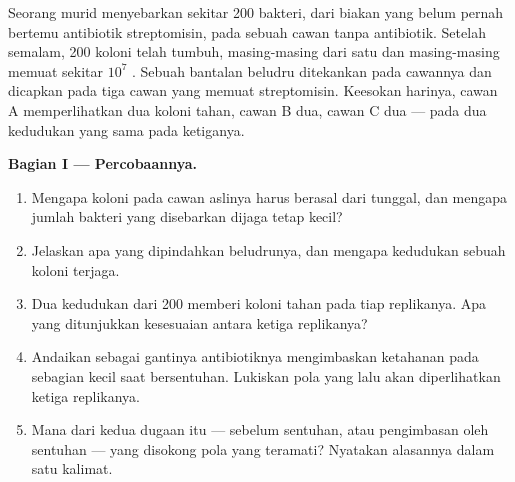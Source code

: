 \begin{problem}
\label{pb:g11:mutations:1}
Seorang murid menyebarkan sekitar 200 bakteri, dari biakan yang belum
pernah bertemu antibiotik streptomisin, pada sebuah cawan tanpa
antibiotik. Setelah semalam, 200 koloni telah tumbuh, masing-masing
dari satu  dan masing-masing memuat sekitar $10^7$ . Sebuah
bantalan beludru ditekankan pada cawannya dan dicapkan pada tiga cawan
yang memuat streptomisin. Keesokan harinya, cawan A memperlihatkan dua
koloni tahan, cawan B dua, cawan C dua --- pada dua kedudukan yang sama
pada ketiganya.

\medskip
\noindent\textbf{Bagian I --- Percobaannya.}
\begin{enumerate}
  \item Mengapa koloni pada cawan aslinya harus berasal dari 
        tunggal, dan mengapa jumlah bakteri yang disebarkan dijaga tetap kecil?
  \item Jelaskan apa yang dipindahkan beludrunya, dan mengapa kedudukan
        sebuah koloni terjaga.
  \item Dua kedudukan dari 200 memberi koloni tahan pada tiap
        replikanya. Apa yang ditunjukkan kesesuaian antara ketiga
        replikanya?
  \item Andaikan sebagai gantinya antibiotiknya mengimbaskan ketahanan
        pada sebagian kecil  saat bersentuhan. Lukiskan pola yang
        lalu akan diperlihatkan ketiga replikanya.
  \item Mana dari kedua dugaan itu ---  sebelum sentuhan, atau
        pengimbasan oleh sentuhan --- yang disokong pola yang teramati?
        Nyatakan alasannya dalam satu kalimat.
\end{enumerate}


\end{problem}
